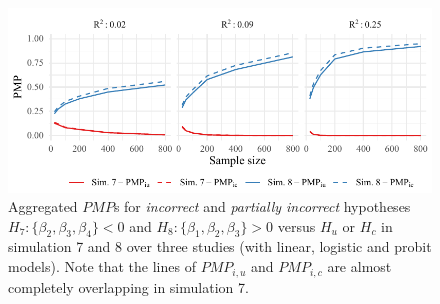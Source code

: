 \documentclass[
]{interact}
\begin{document}
                    \begin{figure}[!t]
                    
                    {\centering \includegraphics[width=1\textwidth,height=\textheight]{manuscript_VK_files/figure-pdf/fig-PMP78-1.pdf}
                      
                    }
                    
                    \caption{\label{fig-PMP78}Aggregated \(PMP\)s for \textit{incorrect} and
                      \textit{partially incorrect} hypotheses
                      \(H_7: \{\beta_2, \beta_3, \beta_4\} < 0\) and
                      \(H_8: \{\beta_1, \beta_2, \beta_3\} > 0\) versus \(H_u\) or \(H_c\) in
                      simulation 7 and 8 over three studies (with linear, logistic and probit
                                                             models). Note that the lines of \(PMP_{i,u}\) and \(PMP_{i,c}\) are
                      almost completely overlapping in simulation 7.}
                    
                    \end{figure}
                    
\end{document}
